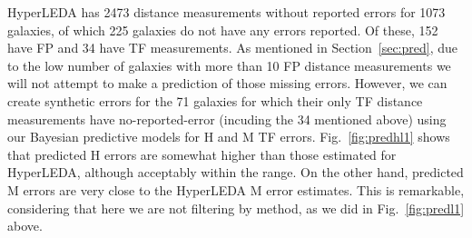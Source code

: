 \documentclass[a4paper,fleqn,usenatbib]{mnras}
\begin{document}
HyperLEDA has 2473 distance measurements without reported errors for 1073 galaxies, of which 225 galaxies do not have any errors reported. Of these, 152 have FP and 34 have TF measurements. As mentioned in Section~\ref{sec:pred}, due to the low number of galaxies with more than 10 FP distance measurements we will not attempt to make a prediction of those missing errors. However, we can create synthetic errors for the 71 galaxies for which their only TF distance measurements have no-reported-error (incuding the 34 mentioned above) using our Bayesian predictive models for H and M TF errors. Fig.~\ref{fig:predhl1} shows that predicted H errors are somewhat higher than those estimated for HyperLEDA, although acceptably within the range. On the other hand, predicted M errors are very close to the HyperLEDA M error estimates. This is remarkable, considering that here we are not filtering by method, as we did in Fig.~\ref{fig:predl1} above.
\end{document}
